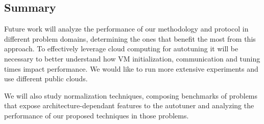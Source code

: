 \subsection{Summary}
\label{sec:cloud-conclusion}

Future work will analyze the performance of our methodology and protocol in
different problem domains, determining the ones that benefit the most from this
approach. To effectively leverage cloud computing for autotuning it will be
necessary to better understand how VM initialization, communication and tuning
times impact performance. We would like to run more extensive experiments and
use different public clouds.

We will also study normalization techniques, composing benchmarks of problems
that expose architecture-dependant features to the autotuner and analyzing the
performance of our proposed techniques in those problems.

